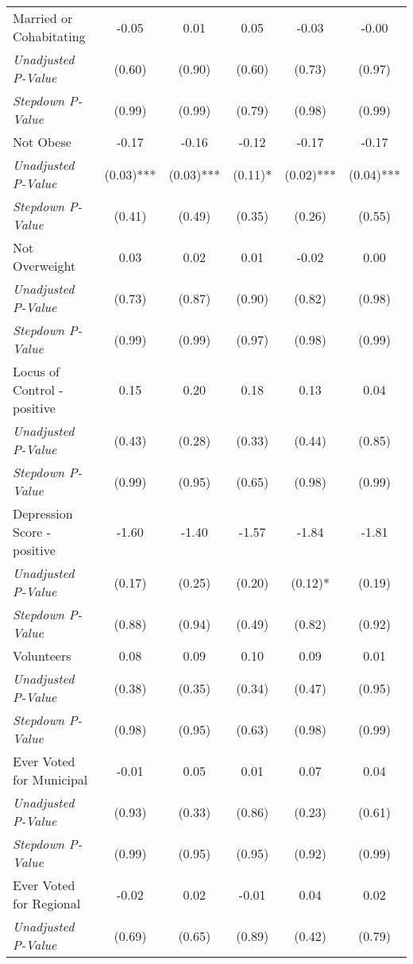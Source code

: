 \begin{tabular}{l c c c c c}
Married or Cohabitating & -0.05 & 0.01 & 0.05 & -0.03 & -0.00 \\
\quad \textit{Unadjusted P-Value} & (0.60) & (0.90) & (0.60) & (0.73) & (0.97) \\
\quad \textit{Stepdown P-Value} & (0.99) & (0.99) & (0.79) & (0.98) & (0.99) \\
Not Obese & -0.17 & -0.16 & -0.12 & -0.17 & -0.17 \\
\quad \textit{Unadjusted P-Value} & (0.03)*** & (0.03)*** & (0.11)* & (0.02)*** & (0.04)*** \\
\quad \textit{Stepdown P-Value} & (0.41) & (0.49) & (0.35) & (0.26) & (0.55) \\
Not Overweight & 0.03 & 0.02 & 0.01 & -0.02 & 0.00 \\
\quad \textit{Unadjusted P-Value} & (0.73) & (0.87) & (0.90) & (0.82) & (0.98) \\
\quad \textit{Stepdown P-Value} & (0.99) & (0.99) & (0.97) & (0.98) & (0.99) \\
Locus of Control - positive & 0.15 & 0.20 & 0.18 & 0.13 & 0.04 \\
\quad \textit{Unadjusted P-Value} & (0.43) & (0.28) & (0.33) & (0.44) & (0.85) \\
\quad \textit{Stepdown P-Value} & (0.99) & (0.95) & (0.65) & (0.98) & (0.99) \\
Depression Score - positive & -1.60 & -1.40 & -1.57 & -1.84 & -1.81 \\
\quad \textit{Unadjusted P-Value} & (0.17) & (0.25) & (0.20) & (0.12)* & (0.19) \\
\quad \textit{Stepdown P-Value} & (0.88) & (0.94) & (0.49) & (0.82) & (0.92) \\
Volunteers & 0.08 & 0.09 & 0.10 & 0.09 & 0.01 \\
\quad \textit{Unadjusted P-Value} & (0.38) & (0.35) & (0.34) & (0.47) & (0.95) \\
\quad \textit{Stepdown P-Value} & (0.98) & (0.95) & (0.63) & (0.98) & (0.99) \\
Ever Voted for Municipal & -0.01 & 0.05 & 0.01 & 0.07 & 0.04 \\
\quad \textit{Unadjusted P-Value} & (0.93) & (0.33) & (0.86) & (0.23) & (0.61) \\
\quad \textit{Stepdown P-Value} & (0.99) & (0.95) & (0.95) & (0.92) & (0.99) \\
Ever Voted for Regional & -0.02 & 0.02 & -0.01 & 0.04 & 0.02 \\
\quad \textit{Unadjusted P-Value} & (0.69) & (0.65) & (0.89) & (0.42) & (0.79) \\

\end{tabular}
